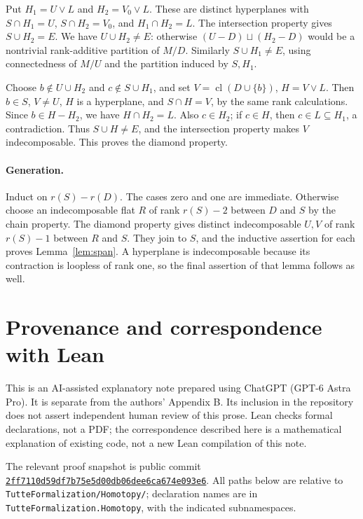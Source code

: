 \documentclass[11pt]{article}
\DeclareMathOperator{\cl}{cl}
\newcommand{\code}[1]{\nolinkurl{#1}}
\begin{document}
Put $H_1=U\vee L$ and $H_2=V_0\vee L$. These are distinct hyperplanes with $S\cap H_1=U$, $S\cap H_2=V_0$, and $H_1\cap H_2=L$. The intersection property gives $S\cup H_2=E$. We have $U\cup H_2\ne E$: otherwise $(U-D)\sqcup(H_2-D)$ would be a nontrivial rank-additive partition of $M/D$. Similarly $S\cup H_1\ne E$, using connectedness of $M/U$ and the partition induced by $S,H_1$.

Choose $b\notin U\cup H_2$ and $c\notin S\cup H_1$, and set $V=\cl(D\cup\{b\})$, $H=V\vee L$. Then $b\in S$, $V\ne U$, $H$ is a hyperplane, and $S\cap H=V$, by the same rank calculations. Since $b\in H-H_2$, we have $H\cap H_2=L$. Also $c\in H_2$; if $c\in H$, then $c\in L\subseteq H_1$, a contradiction. Thus $S\cup H\ne E$, and the intersection property makes $V$ indecomposable. This proves the diamond property.

\paragraph{Generation.}
Induct on $r(S)-r(D)$. The cases zero and one are immediate. Otherwise choose an indecomposable flat $R$ of rank $r(S)-2$ between $D$ and $S$ by the chain property. The diamond property gives distinct indecomposable $U,V$ of rank $r(S)-1$ between $R$ and $S$. They join to $S$, and the inductive assertion for each proves Lemma~\ref{lem:span}. A hyperplane is indecomposable because its contraction is loopless of rank one, so the final assertion of that lemma follows as well.

\clearpage
\section{Provenance and correspondence with Lean}
This is an AI-assisted explanatory note prepared using ChatGPT (GPT-6 Astra Pro). It is separate from the authors' Appendix B. Its inclusion in the repository does not assert independent human review of this prose. Lean checks formal declarations, not a PDF; the correspondence described here is a mathematical explanation of existing code, not a new Lean compilation of this note.

The relevant proof snapshot is public commit
\href{https://github.com/mbaker386/tutte-homotopy-lean/tree/2ff7110d59df7b75e5d00db06dee6ca674e093e6}{\texttt{2ff7110d59df7b75e5d00db06dee6ca674e093e6}}.
All paths below are relative to \code{TutteFormalization/Homotopy/}; declaration names are in \code{TutteFormalization.Homotopy}, with the indicated subnamespaces.
\end{document}
